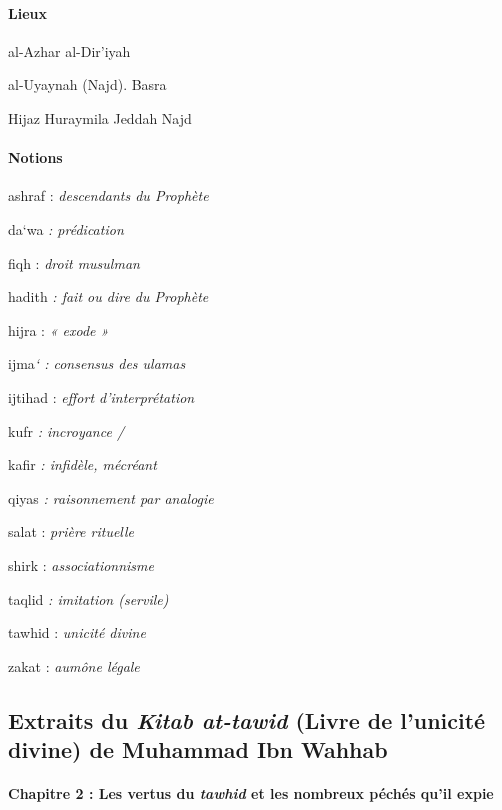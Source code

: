 \paragraph{Lieux}

al-Azhar al-Dir'iyah

al-Uyaynah (Najd). Basra

Hijaz Huraymila Jeddah Najd

\paragraph{Notions}

ashraf : \emph{descendants du Prophète}

da`wa \emph{: prédication}

fiqh : \emph{droit musulman}

hadith \emph{: fait ou dire du Prophète}

hijra : \emph{« exode »}

ijma\emph{` : consensus des ulamas}

ijtihad : \emph{effort d'interprétation}

kufr \emph{: incroyance /} 

kafir \emph{: infidèle, mécréant}

qiyas \emph{: raisonnement par analogie}

salat : \emph{prière rituelle} 

shirk : \emph{associationnisme} 

taqlid
\emph{: imitation (servile)} 

tawhid : \emph{unicité divine}

zakat :
\emph{aumône légale}

\subsection{Extraits du \emph{Kitab at-tawid} (Livre de
l'unicité divine) de Muhammad Ibn Wahhab}

\paragraph{{Chapitre 2} : Les vertus du \emph{tawhid} et les
nombreux péchés qu'il expie}



